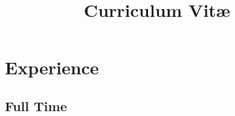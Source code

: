 \documentclass[11pt,a4paper,sans]{moderncv}
\title{Curriculum Vit\ae}
\begin{document}
	
\makecvtitle


\section{Experience}
\subsection{Full Time}
\end{document}
